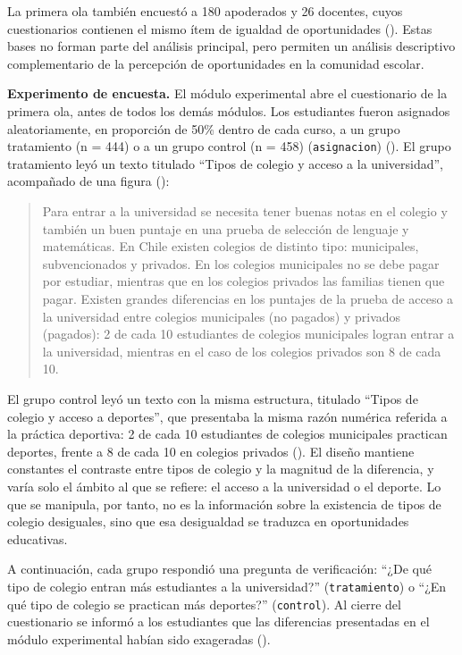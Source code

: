 \documentclass[
  spanish,
  a4paper,
  oneside]{scrbook}
\begin{document}
La primera ola también encuestó a 180 apoderados y 26 docentes, cuyos
cuestionarios contienen el mismo ítem de igualdad de oportunidades
().
Estas bases no forman parte del análisis principal, pero permiten un
análisis descriptivo complementario de la percepción de oportunidades en
la comunidad escolar.

\textbf{Experimento de encuesta.} El módulo experimental abre el
cuestionario de la primera ola, antes de todos los demás módulos. Los
estudiantes fueron asignados aleatoriamente, en proporción de 50\%
dentro de cada curso, a un grupo tratamiento (n = 444) o a un grupo
control (n = 458) (\texttt{asignacion})
().
El grupo tratamiento leyó un texto titulado ``Tipos de colegio y acceso
a la universidad'', acompañado de una figura
():

\begin{quote}
Para entrar a la universidad se necesita tener buenas notas en el
colegio y también un buen puntaje en una prueba de selección de lenguaje
y matemáticas. En Chile existen colegios de distinto tipo: municipales,
subvencionados y privados. En los colegios municipales no se debe pagar
por estudiar, mientras que en los colegios privados las familias tienen
que pagar. Existen grandes diferencias en los puntajes de la prueba de
acceso a la universidad entre colegios municipales (no pagados) y
privados (pagados): 2 de cada 10 estudiantes de colegios municipales
logran entrar a la universidad, mientras en el caso de los colegios
privados son 8 de cada 10.
\end{quote}

El grupo control leyó un texto con la misma estructura, titulado ``Tipos
de colegio y acceso a deportes'', que presentaba la misma razón numérica
referida a la práctica deportiva: 2 de cada 10 estudiantes de colegios
municipales practican deportes, frente a 8 de cada 10 en colegios
privados (). El diseño mantiene constantes el contraste entre tipos
de colegio y la magnitud de la diferencia, y varía solo el ámbito al que
se refiere: el acceso a la universidad o el deporte. Lo que se manipula,
por tanto, no es la información sobre la existencia de tipos de colegio
desiguales, sino que esa desigualdad se traduzca en oportunidades
educativas.

A continuación, cada grupo respondió una pregunta de verificación: ``¿De
qué tipo de colegio entran más estudiantes a la universidad?''
(\texttt{tratamiento}) o ``¿En qué tipo de colegio se practican más
deportes?'' (\texttt{control}). Al cierre del cuestionario se informó a
los estudiantes que las diferencias presentadas en el módulo
experimental habían sido exageradas
().
\end{document}
